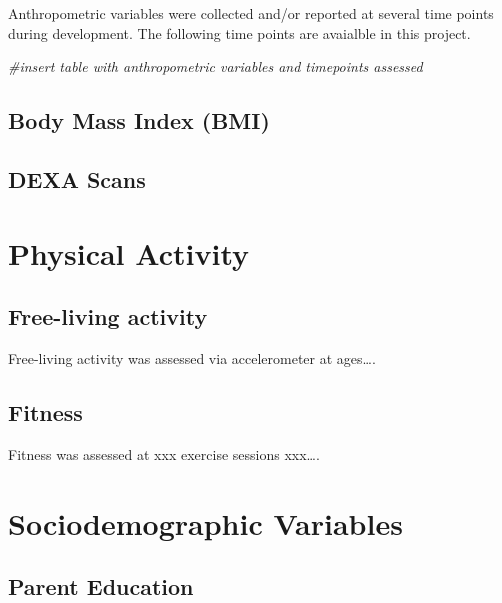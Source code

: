\documentclass[
]{book}
\newenvironment{Shaded}{\begin{snugshade}}{\end{snugshade}}
\newcommand{\CommentTok}[1]{\textcolor[rgb]{0.56,0.35,0.01}{\textit{#1}}}
\begin{document}
Anthropometric variables were collected and/or reported at several time points during development. The following time points are avaialble in this project.

\begin{Shaded}
\begin{Highlighting}[]
\CommentTok{\#insert table with anthropometric variables and timepoints assessed}
\end{Highlighting}
\end{Shaded}

\hypertarget{body-mass-index-bmi}{%
\section{Body Mass Index (BMI)}\label{body-mass-index-bmi}}

\hypertarget{dexa-scans}{%
\section{DEXA Scans}\label{dexa-scans}}

\hypertarget{physical-activity}{%
\chapter{Physical Activity}\label{physical-activity}}

\hypertarget{free-living-activity}{%
\section{Free-living activity}\label{free-living-activity}}

Free-living activity was assessed via accelerometer at ages\ldots.

\hypertarget{fitness}{%
\section{Fitness}\label{fitness}}

Fitness was assessed at xxx exercise sessions xxx\ldots.

\hypertarget{sociodemographic-variables}{%
\chapter{Sociodemographic Variables}\label{sociodemographic-variables}}

\hypertarget{parent-education}{%
\section{Parent Education}\label{parent-education}}
\end{document}
